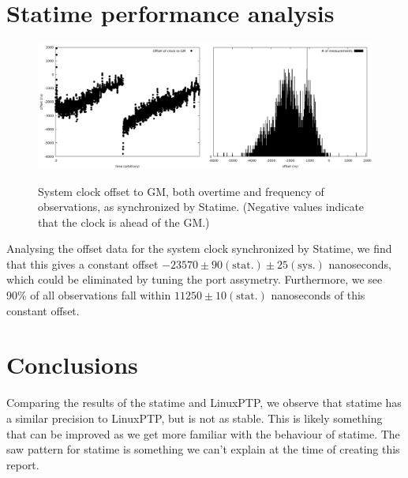 \documentclass{article}
\begin{document}
\section{Statime performance analysis}

\begin{figure}[h]
\includegraphics[width=0.5\textwidth]{gm_statime_offset_overtime.pdf}\includegraphics[width=0.5\textwidth]{gm_statime_offset.pdf}
\caption{System clock offset to GM, both overtime and frequency of observations, as synchronized by Statime. (Negative values indicate that the clock is ahead of the GM.)}
\label{fig:statime_sys_offset}
\end{figure}

Analysing the offset data for the system clock synchronized by Statime, we find that this gives a constant offset $-23570\pm 90(\text{stat.})\pm 25 (\text{sys.})$ nanoseconds, which could be eliminated by tuning the port assymetry. Furthermore, we see 90\% of all observations fall within $11250 \pm 10(\text{stat.})$ nanoseconds of this constant offset.

\section{Conclusions}

Comparing the results of the statime and LinuxPTP, we observe that statime has a similar precision to LinuxPTP, but is not as stable. This is likely something that can be improved as we get more familiar with the behaviour of statime.
The saw pattern for statime is something we can't explain at the time of creating this report.
\end{document}

